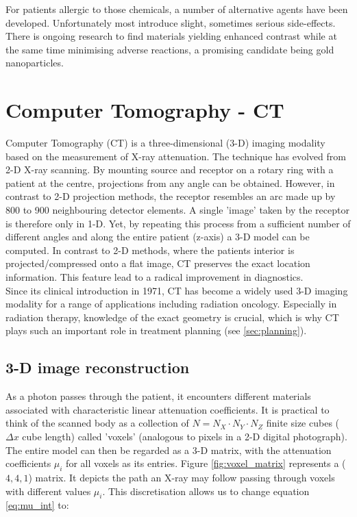 For patients allergic to those chemicals, a number of alternative agents have been developed.
Unfortunately most introduce slight, sometimes serious side-effects.
There is ongoing research to find materials yielding enhanced contrast while at the same time minimising adverse reactions, a promising candidate being gold nanoparticles.


\section{Computer Tomography - CT}
Computer Tomography (CT) is a three-dimensional (3-D) imaging modality based on the measurement of X-ray attenuation.
The technique has evolved from 2-D X-ray scanning.
By mounting source and receptor on a rotary ring with a patient at the centre, projections from any angle can be obtained.
However, in contrast to 2-D projection methods, the receptor resembles an arc made up by 800 to 900 neighbouring detector elements.
A single 'image' taken by the receptor is therefore only in 1-D.
Yet, by repeating this process from a sufficient number of different angles and along the entire patient (z-axis) a 3-D model can be computed.
In contrast to 2-D methods, where the patients interior is projected/compressed onto a flat image, CT preserves the exact location information. This feature lead to a radical improvement in diagnostics.	 \\

Since its clinical introduction in 1971, CT has become a widely used 3-D imaging modality for a range of applications including radiation oncology. Especially in radiation therapy, knowledge of the exact geometry is crucial, which is why CT plays such an important role in treatment planning (see \ref{sec:planning}).

\subsection{3-D image reconstruction}
As a photon passes through the patient, it encounters different materials associated with characteristic linear attenuation coefficients.
It is practical to think of the scanned body as a collection of $N = N_X\cdot N_Y\cdot N_Z$ finite size cubes ($\Delta x$ cube length) called 'voxels' (analogous to pixels in a 2-D digital photograph).
The entire model can then be regarded as a 3-D matrix, with the attenuation coefficients $\mu_i$ for all voxels as its entries.
Figure \ref{fig:voxel_matrix} represents a ($4, 4, 1$) matrix.
It depicts the path an X-ray may follow passing through voxels with different values $\mu_i$.
This discretisation allows us to change equation \ref{eq:mu_int} to:


